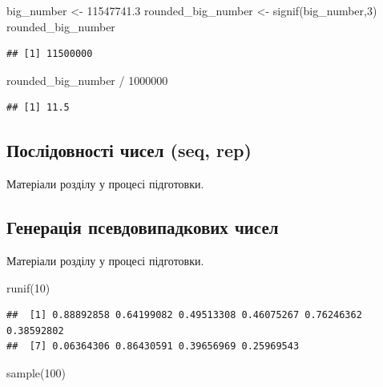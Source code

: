 \documentclass[
]{book}
\newenvironment{Shaded}{\begin{snugshade}}{\end{snugshade}}
\newcommand{\DecValTok}[1]{\textcolor[rgb]{0.00,0.00,0.81}{#1}}
\newcommand{\FloatTok}[1]{\textcolor[rgb]{0.00,0.00,0.81}{#1}}
\newcommand{\FunctionTok}[1]{\textcolor[rgb]{0.00,0.00,0.00}{#1}}
\newcommand{\NormalTok}[1]{#1}
\newcommand{\OtherTok}[1]{\textcolor[rgb]{0.56,0.35,0.01}{#1}}
\newcommand{\SpecialCharTok}[1]{\textcolor[rgb]{0.00,0.00,0.00}{#1}}
\begin{document}
\begin{Shaded}
\begin{Highlighting}[]
\NormalTok{big\_number }\OtherTok{\textless{}{-}} \FloatTok{11547741.3}
\NormalTok{rounded\_big\_number }\OtherTok{\textless{}{-}} \FunctionTok{signif}\NormalTok{(big\_number,}\DecValTok{3}\NormalTok{)}
\NormalTok{rounded\_big\_number}
\end{Highlighting}
\end{Shaded}

\begin{verbatim}
## [1] 11500000
\end{verbatim}

\begin{Shaded}
\begin{Highlighting}[]
\NormalTok{rounded\_big\_number }\SpecialCharTok{/} \DecValTok{1000000}
\end{Highlighting}
\end{Shaded}

\begin{verbatim}
## [1] 11.5
\end{verbatim}

\hypertarget{chapter242}{%
\subsection{Послідовності чисел (seq, rep)}\label{chapter242}}

Матеріали розділу у процесі підготовки.

\hypertarget{chapter243}{%
\subsection{Генерація псевдовипадкових чисел}\label{chapter243}}

Матеріали розділу у процесі підготовки.

\begin{Shaded}
\begin{Highlighting}[]
\FunctionTok{runif}\NormalTok{(}\DecValTok{10}\NormalTok{)}
\end{Highlighting}
\end{Shaded}

\begin{verbatim}
##  [1] 0.88892858 0.64199082 0.49513308 0.46075267 0.76246362 0.38592802
##  [7] 0.06364306 0.86430591 0.39656969 0.25969543
\end{verbatim}

\begin{Shaded}
\begin{Highlighting}[]
\FunctionTok{sample}\NormalTok{(}\DecValTok{100}\NormalTok{)}
\end{Highlighting}
\end{Shaded}
\end{document}
